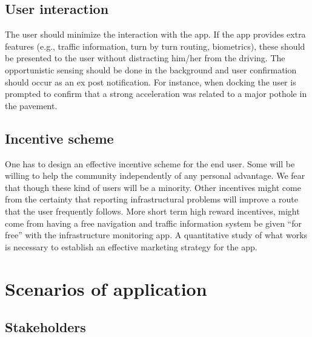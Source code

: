 \documentclass[preprint,12pt]{elsarticle}
\theoremstyle{definition}
\begin{document}
\subsection{User interaction}

The user should minimize the interaction with the app. If the app
provides extra features (e.g., traffic information, turn by turn
routing, biometrics), these should be presented to the user without
distracting him/her from the driving. The opportunistic sensing should
be done in the background and user confirmation should occur as an ex
post notification. For instance, when docking the user is prompted to
confirm that a strong acceleration was related to a major pothole in
the pavement. 


\subsection{Incentive scheme}

One has to design an effective incentive scheme for the end user. Some
will be willing to help the community independently of any personal
advantage. We fear that though these kind of users will be a
minority. Other incentives might come from the certainty that
reporting infrastructural problems will improve a route that the user
frequently follows. More short term high reward incentives, might come
from having a free navigation and traffic information system be given
``for free'' with the infrastructure monitoring app. A quantitative
study of what works is necessary to establish an effective marketing
strategy for the app.


\section{Scenarios of application}

\subsection{Stakeholders}
\end{document}
